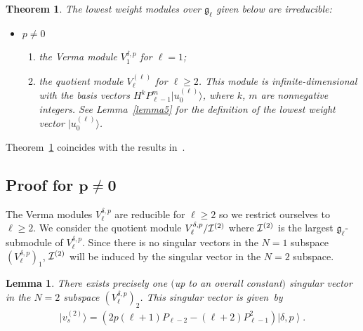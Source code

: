 \documentclass[11pt]{article}
\numberwithin{equation}{section}
\newtheorem{theorem}{Theorem}
\newtheorem{lemma}{Lemma}
\def\ket#1{\left| #1\right\rangle}
\begin{document}
\begin{theorem}
\label{theorem2}
The lowest weight modules over ${\mathfrak g}_{\ell}$ given below are irreducible:
\begin{itemize}\itemsep=0pt
\item $ p \neq 0 $
\begin{enumerate}\itemsep=0pt
\item[$i)$] the Verma module $ V^{\delta,p}_1 $ for $ \ell = 1$;
\item[$ii)$] the quotient module $ V_{\ell}^{(\ell)} $ for $ \ell \geq 2$.
This module is infinite-dimensional with the basis vectors $ H^k P_{\ell-1}^m \big|u_0^{(\ell)}\big\rangle $, where $ k$, $m $ are
nonnegative integers.
See Lemma~{\rm \ref{lemma5}} for the definition of the lowest weight vector $ \big| u_0^{(\ell)}\big\rangle$.
\end{enumerate}
\setcounter{section}{6}
\setcounter{subsection}{0}
\setcounter{subsubsection}{0}
\setcounter{equation}{0}
\end{itemize}
\end{theorem}

Theorem~\ref{theorem2} coincides with the results in~\cite{LuMazoZhao}.

\subsection[Proof for $p \neq 0$]{Proof for $\boldsymbol{p \neq 0}$}
\label{PFqn0}

The Verma modules $ V^{\delta,p}_{\ell} $ are reducible for $ \ell \geq 2 $ so we restrict ourselves to $ \ell \geq 2$.
We consider the quotient module $ V^{\delta,p}_{\ell}/{\cal I}^{(2)} $ where $ {\cal I}^{(2)} $ is the largest
${\mathfrak g}_{\ell}$-submodule of $ V^{\delta,p}_{\ell}$.
Since there is no singular vectors in the $ N = 1 $ subspace $ (V^{\delta,p}_{\ell})_1$, $ {\cal I}^{(2)} $ will be
induced by the singular vector in the $ N = 2 $ subspace.
\begin{lemma}
\label{lemma3}
There exists precisely one $($up to an overall constant$)$ singular vector in the $ N = 2 $ subspace $
(V^{\delta,p}_{\ell})_2$.
This singular vector is given~by
\begin{gather*}
\big|v_s^{(2)}\big\rangle = (2p (\ell+1) P_{\ell-2} - (\ell+2) P_{\ell-1}^2) \ket{\delta,p}.
\end{gather*}
\end{lemma}
\end{document}
